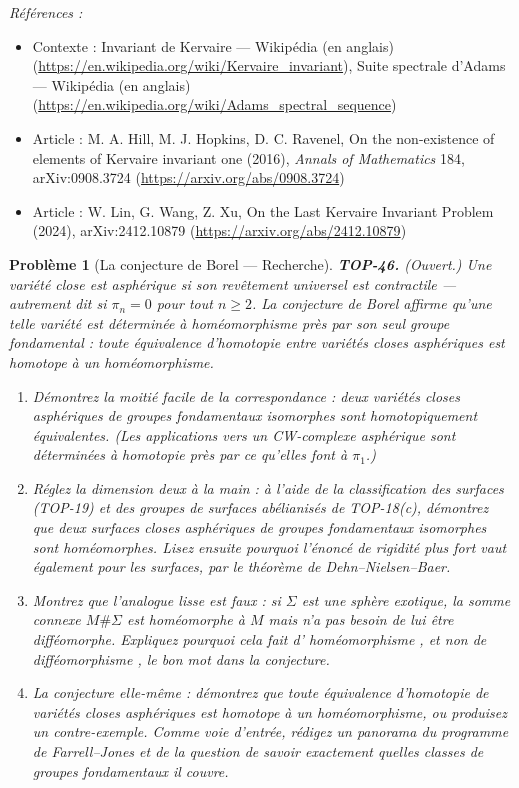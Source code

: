\documentclass[11pt]{article}
\newtheorem{problem}{Problème}
\newenvironment{refs}{\par\small\noindent\emph{Références :}\begin{itemize}\setlength\itemsep{0pt}}{\end{itemize}\normalsize}
\begin{document}
\begin{refs}
\item Contexte : Invariant de Kervaire --- Wikipédia (en anglais) (\url{https://en.wikipedia.org/wiki/Kervaire_invariant}), Suite spectrale d'Adams --- Wikipédia (en anglais) (\url{https://en.wikipedia.org/wiki/Adams_spectral_sequence})
\item Article : M. A. Hill, M. J. Hopkins, D. C. Ravenel, \og{} On the non-existence of elements of Kervaire invariant one \fg{} (2016), \textit{Annals of Mathematics} 184, arXiv:0908.3724 (\url{https://arxiv.org/abs/0908.3724})
\item Article : W. Lin, G. Wang, Z. Xu, \og{} On the Last Kervaire Invariant Problem \fg{} (2024), arXiv:2412.10879 (\url{https://arxiv.org/abs/2412.10879})
\end{refs}

\bigskip

\begin{problem}[{La conjecture de Borel --- Recherche}]
\textbf{TOP-46.} (Ouvert.) Une variété close est \textit{asphérique} si son revêtement universel est
contractile --- autrement dit si $ \pi_n = 0 $ pour tout $ n \ge 2 $. La conjecture de Borel affirme
qu'une telle variété est déterminée à homéomorphisme près par son seul groupe fondamental : toute
équivalence d'homotopie entre variétés closes asphériques est homotope à un homéomorphisme.
\begin{enumerate}
\item[(a)] Démontrez la moitié facile de la correspondance : deux variétés closes asphériques de groupes
fondamentaux isomorphes sont homotopiquement équivalentes. (Les applications vers un CW-complexe
asphérique sont déterminées à homotopie près par ce qu'elles font à $ \pi_1 $.)
\item[(b)] Réglez la dimension deux à la main : à l'aide de la classification des surfaces (TOP-19) et des
groupes de surfaces abélianisés de TOP-18(c), démontrez que deux surfaces closes asphériques de groupes
fondamentaux isomorphes sont homéomorphes. Lisez ensuite pourquoi l'énoncé de rigidité plus fort vaut
également pour les surfaces, par le théorème de Dehn--Nielsen--Baer.
\item[(c)] Montrez que l'analogue lisse est faux : si $ \Sigma $ est une sphère exotique, la somme connexe
$ M \# \Sigma $ est homéomorphe à $ M $ mais n'a pas besoin de lui être difféomorphe. Expliquez
pourquoi cela fait d'\og{} homéomorphisme \fg{}, et non de \og{} difféomorphisme \fg{}, le bon mot dans la
conjecture.
\item[(d)] La conjecture elle-même : démontrez que toute équivalence d'homotopie de variétés closes
asphériques est homotope à un homéomorphisme, ou produisez un contre-exemple. Comme voie d'entrée,
rédigez un panorama du programme de Farrell--Jones et de la question de savoir exactement quelles classes
de groupes fondamentaux il couvre.
\end{enumerate}

\end{problem}
\end{document}
